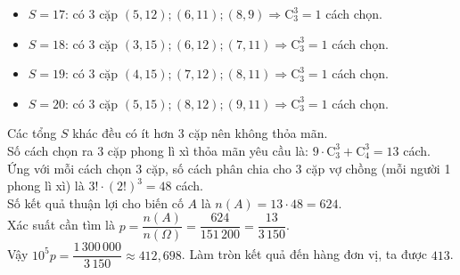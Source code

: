 \begin{ex}
{\begin{itemize}
			\item $S=17$: có $3$ cặp $(5,12); (6,11); (8,9) \Rightarrow \mathrm{C}_3^3 = 1$ cách chọn.
			\item $S=18$: có $3$ cặp $(3,15); (6,12); (7,11) \Rightarrow \mathrm{C}_3^3 = 1$ cách chọn.
			\item $S=19$: có $3$ cặp $(4,15); (7,12); (8,11) \Rightarrow \mathrm{C}_3^3 = 1$ cách chọn.
			\item $S=20$: có $3$ cặp $(5,15); (8,12); (9,11) \Rightarrow \mathrm{C}_3^3 = 1$ cách chọn.
		\end{itemize}
		Các tổng $S$ khác đều có ít hơn $3$ cặp nên không thỏa mãn.\\
		Số cách chọn ra 3 cặp phong lì xì thỏa mãn yêu cầu là: $9 \cdot \mathrm{C}_3^3 + \mathrm{C}_4^3 = 13$ cách.\\
		Ứng với mỗi cách chọn $3$ cặp, số cách phân chia cho $3$ cặp vợ chồng (mỗi người 1 phong lì xì) là $3! \cdot (2!)^3 = 48$ cách.\\
		Số kết quả thuận lợi cho biến cố $A$ là $n(A) = 13 \cdot 48 = 624$.\\
		Xác suất cần tìm là $p = \dfrac{n(A)}{n(\Omega)} = \dfrac{624}{151\,200} = \dfrac{13}{3\,150}$.\\
		Vậy $10^5 p = \dfrac{1\,300\,000}{3\,150} \approx 412{,}698$. Làm tròn kết quả đến hàng đơn vị, ta được $413$.
	}
\end{ex}
\newpage
{}
\label{B\thedeso}

